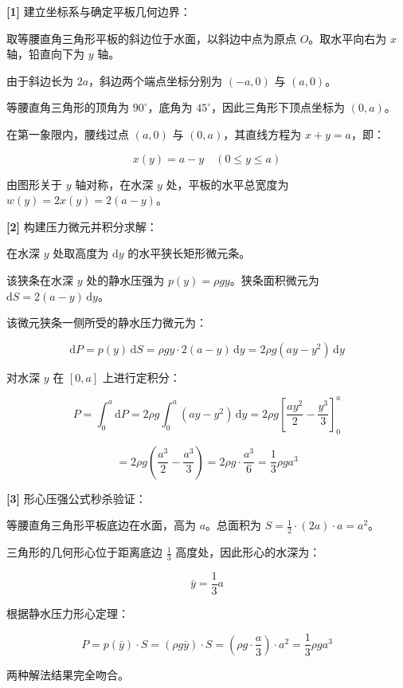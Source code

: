 \documentclass[11pt,a4paper,UTF8]{ctexart}
\begin{document}
\begin{solbox}[分步推导与答题规范]
\textbf{[1]} 建立坐标系与确定平板几何边界：

取等腰直角三角形平板的斜边位于水面，以斜边中点为原点 $O$。取水平向右为 $x$ 轴，铅直向下为 $y$ 轴。

由于斜边长为 $2a$，斜边两个端点坐标分别为 $(-a, 0)$ 与 $(a, 0)$。

等腰直角三角形的顶角为 $90^\circ$，底角为 $45^\circ$，因此三角形下顶点坐标为 $(0, a)$。

在第一象限内，腰线过点 $(a, 0)$ 与 $(0, a)$，其直线方程为 $x + y = a$，即：


\begin{equation*}
x(y) = a - y \quad (0 \leqslant y \leqslant a)
\end{equation*}


由图形关于 $y$ 轴对称，在水深 $y$ 处，平板的水平总宽度为 $w(y) = 2x(y) = 2(a - y)$。

\textbf{[2]} 构建压力微元并积分求解：

在水深 $y$ 处取高度为 $\mathrm{d}y$ 的水平狭长矩形微元条。

该狭条在水深 $y$ 处的静水压强为 $p(y) = \rho g y$。狭条面积微元为 $\mathrm{d}S = 2(a - y)\,\mathrm{d}y$。

该微元狭条一侧所受的静水压力微元为：


\begin{equation*}
\mathrm{d}P = p(y)\,\mathrm{d}S = \rho g y \cdot 2(a - y)\,\mathrm{d}y = 2\rho g (ay - y^2)\,\mathrm{d}y
\end{equation*}


对水深 $y$ 在 $[0, a]$ 上进行定积分：


\begin{equation*}
P = \int_0^a \mathrm{d}P = 2\rho g \int_0^a (ay - y^2)\,\mathrm{d}y = 2\rho g \left[\frac{a y^2}{2} - \frac{y^3}{3}\right]_0^a
\end{equation*}



\begin{equation*}
= 2\rho g \left(\frac{a^3}{2} - \frac{a^3}{3}\right) = 2\rho g \cdot \frac{a^3}{6} = \frac{1}{3}\rho g a^3
\end{equation*}


\textbf{[3]} 形心压强公式秒杀验证：

等腰直角三角形平板底边在水面，高为 $a$。总面积为 $S = \frac{1}{2} \cdot (2a) \cdot a = a^2$。

三角形的几何形心位于距离底边 $\frac{1}{3}$ 高度处，因此形心的水深为：


\begin{equation*}
\bar{y} = \frac{1}{3}a
\end{equation*}


根据静水压力形心定理：


\begin{equation*}
P = p(\bar{y}) \cdot S = (\rho g \bar{y}) \cdot S = \left(\rho g \cdot \frac{a}{3}\right) \cdot a^2 = \frac{1}{3}\rho g a^3
\end{equation*}


两种解法结果完全吻合。
\end{solbox}
\end{document}
